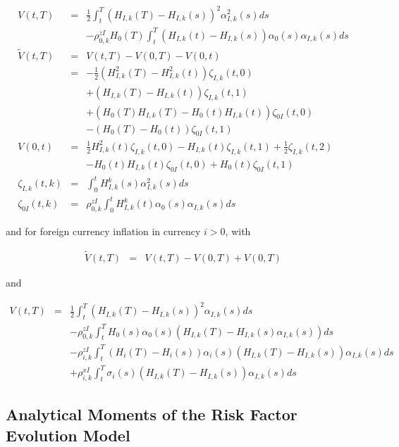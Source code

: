 \documentclass[12pt, a4paper]{article}
\begin{document}
{{\begin{appendix}
\begin{eqnarray*}
  V(t,T) &=& \frac{1}{2} \int_t^T (H_{I,k}(T)-H_{I,k}(s))^2 \alpha_{I,k}^2(s) ds \\
         & & - \rho^{zI}_{0,k} H_0(T) \int_t^T (H_{I,k}(t)-H_{I,k}(s))\alpha_0(s)\alpha_{I,k}(s)ds \\
  \tilde{V}(t,T) &=& V(t,T) - V(0,T) -V(0,t) \\
         &=& -\frac{1}{2}(H_{I,k}^2(T)-H_{I,k}^2(t))\zeta_{I,k}(t,0) \\
         & & +(H_{I,k}(T)-H_{I,k}(t)) \zeta_{I,k}(t,1) \\
         & & +(H_0(T)H_{I,k}(T) - H_0(t)H_{I,k}(t))\zeta_{0I}(t,0) \\
         & & -(H_0(T)-H_0(t))\zeta_{0I}(t,1) \\
  V(0,t) &=& \frac{1}{2}H_{I,k}^2(t)\zeta_{I,k}(t,0)-H_{I,k}(t)\zeta_{I,k}(t,1)+\frac{1}{2}\zeta_{I,k}(t,2) \\
         & & -H_0(t)H_{I,k}(t)\zeta_{0I}(t,0)+H_0(t)\zeta_{0I}(t,1) \\
  \zeta_{I,k}(t,k) &=& \int_0^t H_{I,k}^k(s)\alpha_{I,k}^2(s) ds \\
  \zeta_{0I}(t,k) &=& \rho^{zI}_{0,k}\int_0^t H_{I,k}^k(t) \alpha_0(s) \alpha_{I,k}(s) ds
\end{eqnarray*}

and for foreign currency inflation in currency $i>0$, with

\begin{eqnarray*}
  \tilde{V}(t,T) &=& V(t,T) -V(0,T) + V(0,T)
\end{eqnarray*}

and

\begin{eqnarray*}
  V(t,T) &=& \frac{1}{2}\int_t^T (H_{I,k}(T)-H_{I,k}(s))^2 \alpha_{I,k}(s) ds \\
  & & -\rho^{zI}_{0,k} \int_t^T H_0(s)\alpha_0(s)(H_{I,k}(T)-H_{I,k}(s)\alpha_{I,k}(s)) ds \\
  & & -\rho^{zI}_{i,k} \int_t^T (H_i(T)-H_i(s))\alpha_i(s)(H_{I,k}(T)-H_{I,k}(s))\alpha_{I,k}(s) ds \\
  & & +\rho^{xI}_{i,k} \int_t^T \sigma_i(s)(H_{I,k}(T)-H_{I,k}(s))\alpha_{I,k}(s) ds
\end{eqnarray*}

\subsection{Analytical Moments of the Risk Factor Evolution Model}\label{sec:app_analytical_moments}


\end{appendix}}}
\end{document}
